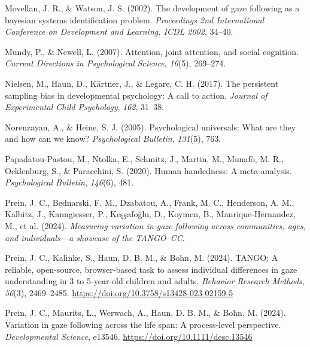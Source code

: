 \documentclass[
  man,floatsintext]{apa7}
\newlength{\cslhangindent}
\newlength{\cslentryspacingunit} %
\newenvironment{CSLReferences}[2] %
 {%
  \setlength{\parindent}{0pt}
  \ifodd #1
  \let\oldpar\par
  \def\par{\hangindent=\cslhangindent\oldpar}
  \fi
  \setlength{\parskip}{#2\cslentryspacingunit}
 }%
 {}
\begin{document}
\begin{CSLReferences}{1}{0}
\leavevmode{}%
Movellan, J. R., \& Watson, J. S. (2002). The development of gaze following as a bayesian systems identification problem. \emph{Proceedings 2nd International Conference on Development and Learning. ICDL 2002}, 34--40.

\leavevmode{}%
Mundy, P., \& Newell, L. (2007). Attention, joint attention, and social cognition. \emph{Current Directions in Psychological Science}, \emph{16}(5), 269--274.

\leavevmode{}%
Nielsen, M., Haun, D., Kärtner, J., \& Legare, C. H. (2017). The persistent sampling bias in developmental psychology: A call to action. \emph{Journal of Experimental Child Psychology}, \emph{162}, 31--38.

\leavevmode{}%
Norenzayan, A., \& Heine, S. J. (2005). Psychological universals: What are they and how can we know? \emph{Psychological Bulletin}, \emph{131}(5), 763.

\leavevmode{}%
Papadatou-Pastou, M., Ntolka, E., Schmitz, J., Martin, M., Munafò, M. R., Ocklenburg, S., \& Paracchini, S. (2020). Human handedness: A meta-analysis. \emph{Psychological Bulletin}, \emph{146}(6), 481.

\leavevmode{}%
Prein, J. C., Bednarski, F. M., Dzabatou, A., Frank, M. C., Henderson, A. M., Kalbitz, J., Kanngiesser, P., Keşşafoğlu, D., Koymen, B., Manrique-Hernandez, M., et al. (2024). \emph{Measuring variation in gaze following across communities, ages, and individuals---a showcase of the TANGO--CC}.

\leavevmode{}%
Prein, J. C., Kalinke, S., Haun, D. B. M., \& Bohn, M. (2024). {TANGO}: {A} reliable, open-source, browser-based task to assess individual differences in gaze understanding in 3 to 5-year-old children and adults. \emph{Behavior Research Methods}, \emph{56}(3), 2469--2485. \url{https://doi.org/10.3758/s13428-023-02159-5}

\leavevmode{}%
Prein, J. C., Maurits, L., Werwach, A., Haun, D. B. M., \& Bohn, M. (2024). Variation in gaze following across the life span: {A} process-level perspective. \emph{Developmental Science}, e13546. \url{https://doi.org/10.1111/desc.13546}


\end{CSLReferences}
\end{document}
